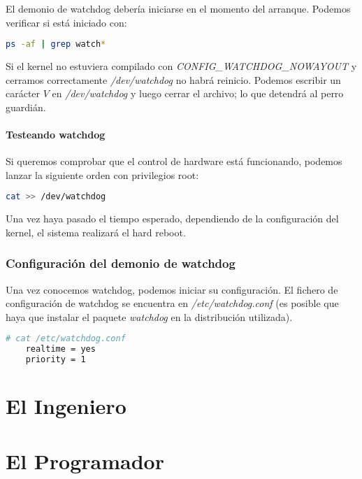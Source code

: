 \documentclass[a4paper, 11pt, titlepage]{book}
\begin{document}
        El demonio de watchdog debería iniciarse en el momento del arranque. 
        Podemos verificar si está iniciado con:

        \begin{lstlisting}[language=bash]
    ps -af | grep watch*\end{lstlisting}

        Si el kernel no estuviera compilado con \textit{CONFIG\_WATCHDOG\_NOWAYOUT}
        y cerramos correctamente \textit{/dev/watchdog} no habrá reinicio. Podemos 
        escribir un carácter $V$ en \textit{/dev/watchdog} y luego cerrar el archivo;
        lo que detendrá al perro guardián.

        \subsubsection{Testeando watchdog} Si queremos comprobar que el control de 
        hardware está funcionando, podemos lanzar la siguiente orden con privilegios 
        root:

        \begin{lstlisting}[language=bash]
    cat >> /dev/watchdog\end{lstlisting}

        Una vez haya pasado el tiempo esperado, dependiendo de la configuración 
        del kernel, el sistema realizará el hard reboot.

    \subsection{Configuración del demonio de watchdog}

        Una vez conocemos watchdog, podemos iniciar su configuración. El fichero de 
        configuración de watchdog se encuentra en \textit{/etc/watchdog.conf} 
        (es posible que haya que instalar el paquete \textit{watchdog} en la distribución 
        utilizada).

        \begin{lstlisting}[language=bash]
    # cat /etc/watchdog.conf
    realtime = yes
    priority = 1\end{lstlisting}

\chapter{El Ingeniero}

\chapter{El Programador}
\end{document}
